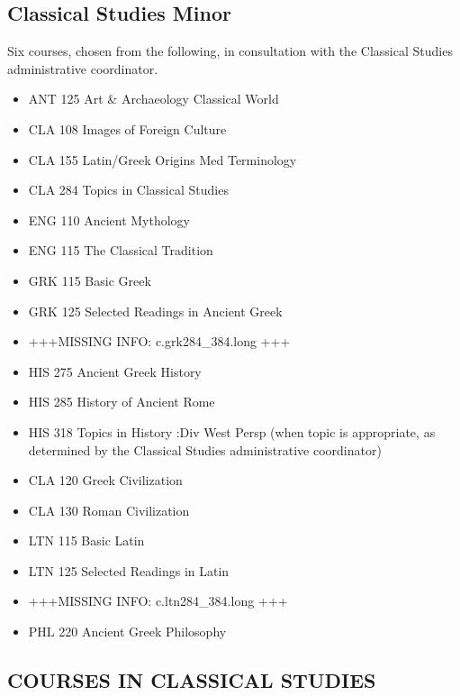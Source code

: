 \documentclass[
  letterpaper,
]{scrbook}
\providecommand{\tightlist}{%
  \setlength{\itemsep}{0pt}\setlength{\parskip}{0pt}}
\begin{document}
\subsection{Classical Studies Minor}\label{classical-studies-minor}

Six courses, chosen from the following, in consultation with the
Classical Studies administrative coordinator.

\begin{itemize}
\tightlist
\item
  ANT 125 Art \& Archaeology Classical World
\item
  CLA 108 Images of Foreign Culture
\item
  CLA 155 Latin/Greek Origins Med Terminology
\item
  CLA 284 Topics in Classical Studies
\item
  ENG 110 Ancient Mythology
\item
  ENG 115 The Classical Tradition
\item
  GRK 115 Basic Greek
\item
  GRK 125 Selected Readings in Ancient Greek
\item
  +++MISSING INFO: c.grk284\_384.long +++
\item
  HIS 275 Ancient Greek History
\item
  HIS 285 History of Ancient Rome
\item
  HIS 318 Topics in History :Div West Persp (when topic is appropriate,
  as determined by the Classical Studies administrative coordinator)
\item
  CLA 120 Greek Civilization
\item
  CLA 130 Roman Civilization
\item
  LTN 115 Basic Latin
\item
  LTN 125 Selected Readings in Latin
\item
  +++MISSING INFO: c.ltn284\_384.long +++
\item
  PHL 220 Ancient Greek Philosophy
\end{itemize}

\subsection{COURSES IN CLASSICAL
STUDIES}\label{courses-in-classical-studies}
\end{document}
